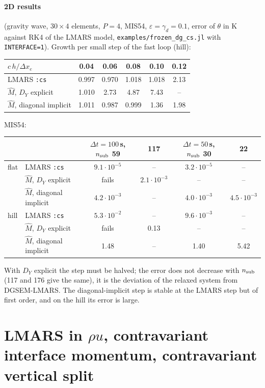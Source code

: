 \documentclass[11pt,a4paper]{article}
\newcommand{\code}[1]{\texttt{#1}}
\newcommand{\dt}{\Delta t}
\begin{document}
\paragraph{2D results} (gravity wave, $30\times4$ elements, $P=4$, MIS54, $\varepsilon=\gamma_d=0.1$, error of $\theta$ in K against RK4 of the LMARS model,
\code{examples/frozen\_dg\_cs.jl} with \code{INTERFACE=1}). Growth per small step of the fast loop (hill):
\begin{center}\small
\begin{tabular}{lccccc}\toprule
$c\,h/\Delta x_e$ & 0.04 & 0.06 & 0.08 & 0.10 & 0.12\\\midrule
LMARS \code{:cs} & 0.997 & 0.970 & 1.018 & 1.018 & 2.13\\
$\hat M$, $D_Y$ explicit & 1.010 & 2.73 & 4.87 & 7.43 & --\\
$\hat M$, diagonal implicit & 1.011 & 0.987 & 0.999 & 1.36 & 1.98\\\bottomrule
\end{tabular}
\end{center}
MIS54:
\begin{center}\footnotesize\setlength{\tabcolsep}{4pt}
\begin{tabular}{llcccc}\toprule
 & & $\dt=100$\,s, $n_{\rm sub}$ 59 & 117 & $\dt=50$\,s, $n_{\rm sub}$ 30 & 22\\\midrule
flat & LMARS \code{:cs} & $9.1\cdot10^{-5}$ & -- & $3.2\cdot10^{-5}$ & --\\
 & $\hat M$, $D_Y$ explicit & fails & $2.1\cdot10^{-3}$ & -- & --\\
 & $\hat M$, diagonal implicit & $4.2\cdot10^{-3}$ & -- & $4.0\cdot10^{-3}$ & $4.5\cdot10^{-3}$\\
hill & LMARS \code{:cs} & $5.3\cdot10^{-2}$ & -- & $9.6\cdot10^{-3}$ & --\\
 & $\hat M$, $D_Y$ explicit & fails & 0.13 & -- & --\\
 & $\hat M$, diagonal implicit & 1.48 & -- & 1.40 & 5.42\\\bottomrule
\end{tabular}
\end{center}
With $D_Y$ explicit the step must be halved; the error does not decrease with $n_{\rm sub}$ (117 and 176 give the same), it is the
deviation of the relaxed system from DGSEM-LMARS. The diagonal-implicit step is stable at the LMARS step but of first order, and on
the hill its error is large.

\section{LMARS in $\rho u$, contravariant interface momentum, contravariant vertical split}
\end{document}
